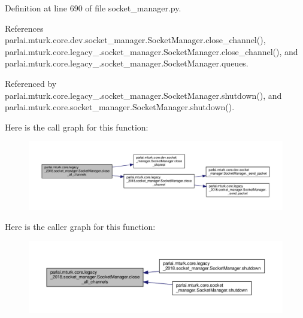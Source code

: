 Definition at line 690 of file socket\+\_\+manager.\+py.



References parlai.\+mturk.\+core.\+dev.\+socket\+\_\+manager.\+Socket\+Manager.\+close\+\_\+channel(), parlai.\+mturk.\+core.\+legacy\+\_.\+socket\+\_\+manager.\+Socket\+Manager.\+close\+\_\+channel(), and parlai.\+mturk.\+core.\+legacy\+\_.\+socket\+\_\+manager.\+Socket\+Manager.\+queues.



Referenced by parlai.\+mturk.\+core.\+legacy\+\_.\+socket\+\_\+manager.\+Socket\+Manager.\+shutdown(), and parlai.\+mturk.\+core.\+socket\+\_\+manager.\+Socket\+Manager.\+shutdown().

Here is the call graph for this function\+:
\nopagebreak
\begin{figure}[H]
\begin{center}
\leavevmode
\includegraphics[width=350pt]{classparlai_1_1mturk_1_1core_1_1legacy__2018_1_1socket__manager_1_1SocketManager_ab005f976aeba162ce019724c0e093cae_cgraph}
\end{center}
\end{figure}
Here is the caller graph for this function\+:
\nopagebreak
\begin{figure}[H]
\begin{center}
\leavevmode
\includegraphics[width=350pt]{classparlai_1_1mturk_1_1core_1_1legacy__2018_1_1socket__manager_1_1SocketManager_ab005f976aeba162ce019724c0e093cae_icgraph}
\end{center}
\end{figure}
\mbox{\label{classparlai_1_1mturk_1_1core_1_1legacy__2018_1_1socket__manager_1_1SocketManager_aba8ba15b13ecbf57b9bc9ef15d9ba620}} 

